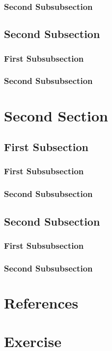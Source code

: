 \documentclass{book}
\begin{document}
\subsubsection{Second Subsubsection}
\lipsum
\subsection{Second Subsection}
\subsubsection{First Subsubsection}
\lipsum
\subsubsection{Second Subsubsection}
\lipsum

\section{Second Section}
\lipsum
\subsection{First Subsection}
\subsubsection{First Subsubsection}
\lipsum
\subsubsection{Second Subsubsection}
\lipsum
\subsection{Second Subsection}
\subsubsection{First Subsubsection}
\lipsum
\subsubsection{Second Subsubsection}
\lipsum

\section*{References}
\lipsum
\section*{Exercise}
\lipsum
\end{document}

